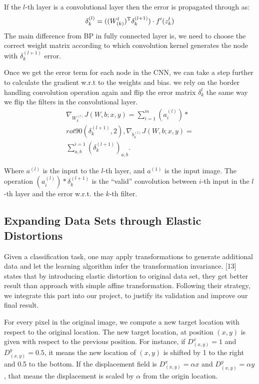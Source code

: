 If the $l$-th layer is a convolutional layer then the error is propagated through as:
\begin{equation}
\delta_k^{(l)}=((W_{(k)}^{l})^{\rm T}\delta_k^{(l+1)})\cdot f'(z_k^l)
\end{equation}
The main difference from BP in fully connected layer is, we need to choose the correct weight matrix according to which convolution kernel generates the node with $\delta_k^{(l+1)}$ error.

Once we get the error term for each node in the CNN, we can take a step further to calculate the gradient w.r.t to the weights and bias. we rely on the border handling convolution operation again and flip the error matrix $\delta_k^l$ the same way we flip the filters in the convolutional layer.
\begin{equation}
\begin{split}
\nabla_{W_k^{(l)}}J(W,b;x,y)=\sum_{i=1}^m(a_i^{(l)})\ast\\ rot90(\delta_k^{(l+1)},2), \nabla_{b_k^{(l)}}J(W,b;x,y) =\\ \sum_{a,b}^{i=1}(\delta_k^{(l+1)})_{a,b}.
\end{split}
\end{equation}

Where $a^{(l)}$ is the input to the $l$-th layer, and $a^{(1)}$ is the input image. The operation $(a^{(l)}_i)\ast\delta^(l+1)_k$ is the ``valid'' convolution between $i$-th input in the $l$-th layer and the error w.r.t. the $k$-th filter.

\subsection{Expanding Data Sets through Elastic Distortions}
Given a classification task, one may apply transformations to generate additional data and let the learning algorithm infer the transformation invariance. [13] states that by introducing elastic distortion to original data set, they get better result than approach with simple affine transformation. Following their strategy, we integrate this part into our project, to justify its validation and improve our final result.

For every pixel in the original image, we compute a new target location with respect to the original location. The new target location, at position $(x,y)$ is given with respect to the previous position. For instance, if $D^x_{(x,y)}=1$ and $D^y_{(x,y)}=0.5$, it means the new location of $(x,y)$ is shifted by 1 to the right and 0.5 to the bottom. If the displacement field is $D^x_{(x,y)}=\alpha x$ and $D^y_{(x,y)}=\alpha y$, that means the displacement is scaled by $\alpha$ from the origin location.

